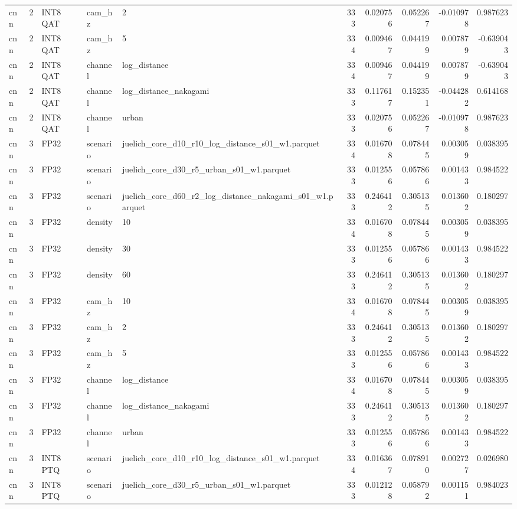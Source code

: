 \begin{tabular}{lrlllrrrrr}
cnn & 2 & INT8 QAT & cam\_hz & 2 & 333 & 0.020756 & 0.052267 & -0.010978 & 0.987623 \\
cnn & 2 & INT8 QAT & cam\_hz & 5 & 334 & 0.009467 & 0.044199 & 0.007879 & -0.639043 \\
cnn & 2 & INT8 QAT & channel & log\_distance & 334 & 0.009467 & 0.044199 & 0.007879 & -0.639043 \\
cnn & 2 & INT8 QAT & channel & log\_distance\_nakagami & 333 & 0.117617 & 0.152351 & -0.044282 & 0.614168 \\
cnn & 2 & INT8 QAT & channel & urban & 333 & 0.020756 & 0.052267 & -0.010978 & 0.987623 \\
cnn & 3 & FP32 & scenario & juelich\_core\_d10\_r10\_log\_distance\_s01\_w1.parquet & 334 & 0.016708 & 0.078445 & 0.003059 & 0.038395 \\
cnn & 3 & FP32 & scenario & juelich\_core\_d30\_r5\_urban\_s01\_w1.parquet & 333 & 0.012556 & 0.057866 & 0.001433 & 0.984522 \\
cnn & 3 & FP32 & scenario & juelich\_core\_d60\_r2\_log\_distance\_nakagami\_s01\_w1.parquet & 333 & 0.246412 & 0.305135 & 0.013602 & 0.180297 \\
cnn & 3 & FP32 & density & 10 & 334 & 0.016708 & 0.078445 & 0.003059 & 0.038395 \\
cnn & 3 & FP32 & density & 30 & 333 & 0.012556 & 0.057866 & 0.001433 & 0.984522 \\
cnn & 3 & FP32 & density & 60 & 333 & 0.246412 & 0.305135 & 0.013602 & 0.180297 \\
cnn & 3 & FP32 & cam\_hz & 10 & 334 & 0.016708 & 0.078445 & 0.003059 & 0.038395 \\
cnn & 3 & FP32 & cam\_hz & 2 & 333 & 0.246412 & 0.305135 & 0.013602 & 0.180297 \\
cnn & 3 & FP32 & cam\_hz & 5 & 333 & 0.012556 & 0.057866 & 0.001433 & 0.984522 \\
cnn & 3 & FP32 & channel & log\_distance & 334 & 0.016708 & 0.078445 & 0.003059 & 0.038395 \\
cnn & 3 & FP32 & channel & log\_distance\_nakagami & 333 & 0.246412 & 0.305135 & 0.013602 & 0.180297 \\
cnn & 3 & FP32 & channel & urban & 333 & 0.012556 & 0.057866 & 0.001433 & 0.984522 \\
cnn & 3 & INT8 PTQ & scenario & juelich\_core\_d10\_r10\_log\_distance\_s01\_w1.parquet & 334 & 0.016367 & 0.078910 & 0.002727 & 0.026980 \\
cnn & 3 & INT8 PTQ & scenario & juelich\_core\_d30\_r5\_urban\_s01\_w1.parquet & 333 & 0.012128 & 0.058792 & 0.001151 & 0.984023 \\

\end{tabular}
